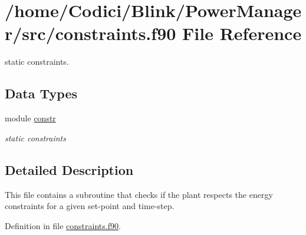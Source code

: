 \hypertarget{constraints_8f90}{\section{/home/\-Codici/\-Blink/\-Power\-Manager/src/constraints.f90 File Reference}
\label{constraints_8f90}
}


static constraints.  


\subsection*{Data Types}
\begin{DoxyCompactItemize}
\item 
module \hyperlink{classconstr}{constr}
\begin{DoxyCompactList}\small\item\em static constraints \end{DoxyCompactList}\end{DoxyCompactItemize}


\subsection{Detailed Description}
This file contains a subroutine that checks if the plant respects the energy constraints for a given set-\/point and time-\/step. 

Definition in file \hyperlink{constraints_8f90_source}{constraints.\-f90}.

